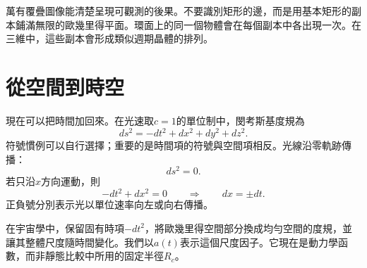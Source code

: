 萬有覆疊圖像能清楚呈現可觀測的後果。不要識別矩形的邊，而是用基本矩形的副本鋪滿無限的歐幾里得平面。環面上的同一個物體會在每個副本中各出現一次。在三維中，這些副本會形成類似週期晶體的排列。

\begin{classroomqa}
\end{classroomqa}

\begin{classroomqa}
\end{classroomqa}

\section{從空間到時空}

現在可以把時間加回來。在光速取\(c=1\)的單位制中，閔考斯基度規為
\begin{equation}
ds^2 = -dt^2 + dx^2 + dy^2 + dz^2.
\label{eq:c03-minkowski}
\end{equation}
符號慣例可以自行選擇；重要的是時間項的符號與空間項相反。光線沿零軌跡傳播：
\begin{equation}
ds^2 = 0.
\end{equation}
若只沿\(x\)方向運動，則
\begin{equation}
-dt^2 + dx^2 = 0
\qquad\Rightarrow\qquad
dx = \pm dt.
\label{eq:c03-null-flat}
\end{equation}
正負號分別表示光以單位速率向左或向右傳播。

在宇宙學中，保留固有時項\(-dt^2\)，將歐幾里得空間部分換成均勻空間的度規，並讓其整體尺度隨時間變化。我們以\(a(t)\)表示這個尺度因子。它現在是動力學函數，而非靜態比較中所用的固定半徑\(R_c\)。


